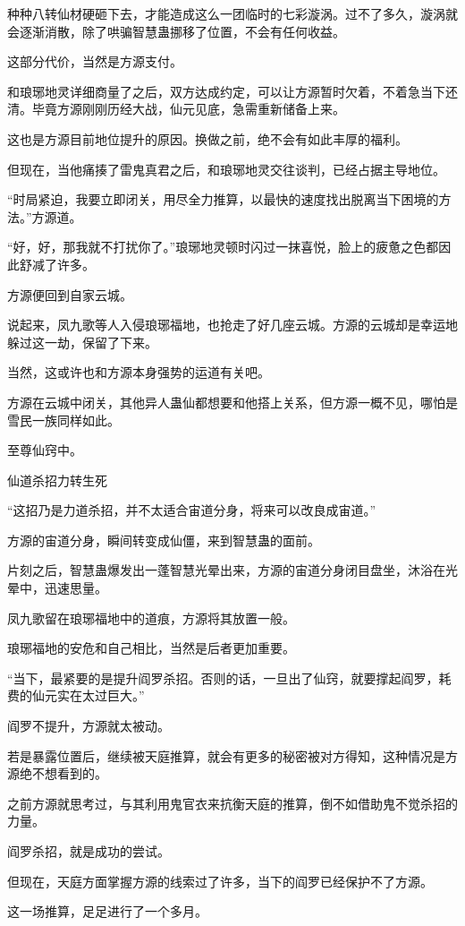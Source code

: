 \begin{this_body}
种种八转仙材硬砸下去，才能造成这么一团临时的七彩漩涡。过不了多久，漩涡就会逐渐消散，除了哄骗智慧蛊挪移了位置，不会有任何收益。

这部分代价，当然是方源支付。

和琅琊地灵详细商量了之后，双方达成约定，可以让方源暂时欠着，不着急当下还清。毕竟方源刚刚历经大战，仙元见底，急需重新储备上来。

这也是方源目前地位提升的原因。换做之前，绝不会有如此丰厚的福利。

但现在，当他痛揍了雷鬼真君之后，和琅琊地灵交往谈判，已经占据主导地位。

“时局紧迫，我要立即闭关，用尽全力推算，以最快的速度找出脱离当下困境的方法。”方源道。

“好，好，那我就不打扰你了。”琅琊地灵顿时闪过一抹喜悦，脸上的疲惫之色都因此舒减了许多。

方源便回到自家云城。

说起来，凤九歌等人入侵琅琊福地，也抢走了好几座云城。方源的云城却是幸运地躲过这一劫，保留了下来。

当然，这或许也和方源本身强势的运道有关吧。

方源在云城中闭关，其他异人蛊仙都想要和他搭上关系，但方源一概不见，哪怕是雪民一族同样如此。

至尊仙窍中。

仙道杀招力转生死

“这招乃是力道杀招，并不太适合宙道分身，将来可以改良成宙道。”

方源的宙道分身，瞬间转变成仙僵，来到智慧蛊的面前。

片刻之后，智慧蛊爆发出一蓬智慧光晕出来，方源的宙道分身闭目盘坐，沐浴在光晕中，迅速思量。

凤九歌留在琅琊福地中的道痕，方源将其放置一般。

琅琊福地的安危和自己相比，当然是后者更加重要。

“当下，最紧要的是提升阎罗杀招。否则的话，一旦出了仙窍，就要撑起阎罗，耗费的仙元实在太过巨大。”

阎罗不提升，方源就太被动。

若是暴露位置后，继续被天庭推算，就会有更多的秘密被对方得知，这种情况是方源绝不想看到的。

之前方源就思考过，与其利用鬼官衣来抗衡天庭的推算，倒不如借助鬼不觉杀招的力量。

阎罗杀招，就是成功的尝试。

但现在，天庭方面掌握方源的线索过了许多，当下的阎罗已经保护不了方源。

这一场推算，足足进行了一个多月。


\end{this_body}
